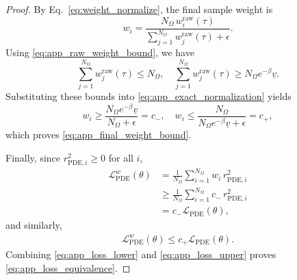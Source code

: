 \documentclass[10pt,a4paper]{amsart}
\begin{document}
\begin{proof}
	By Eq.~\eqref{eq:weight_normalize}, the final sample weight is
	\begin{equation}
		w_i
		=
		\frac{N_{\Omega}\,w_i^{\mathrm{raw}}(\tau)}
		{\sum_{j=1}^{N_{\Omega}}w_j^{\mathrm{raw}}(\tau)+\epsilon}.
		\label{eq:app_exact_normalization}
	\end{equation}
	Using \eqref{eq:app_raw_weight_bound}, we have
	\[
	\sum_{j=1}^{N_{\Omega}}w_j^{\mathrm{raw}}(\tau)
	\leqslant
	N_{\Omega},
	\quad
	\sum_{j=1}^{N_{\Omega}}w_j^{\mathrm{raw}}(\tau)
	\geqslant
	N_{\Omega}e^{-\beta}\underline{v}.
	\]
	Substituting these bounds into \eqref{eq:app_exact_normalization} yields
	\[
	w_i
	\geqslant
	\frac{N_{\Omega}e^{-\beta}\underline{v}}{N_{\Omega}+\epsilon}
	=
	c_-,
	\quad
	w_i
	\leqslant
	\frac{N_{\Omega}}{N_{\Omega}e^{-\beta}\underline{v}+\epsilon}
	=
	c_+,
	\]
	which proves \eqref{eq:app_final_weight_bound}.
	
	Finally, since
	$r_{\mathrm{PDE},i}^{2}\geqslant 0$ for all $i$,
	\begin{align}
		\mathcal{L}_{\mathrm{PDE}}^{w}(\theta)
		&=
		\frac{1}{N_{\Omega}}
		\sum_{i=1}^{N_{\Omega}}
		w_i\,r_{\mathrm{PDE},i}^{2}
		\nonumber\\
		&\geqslant
		\frac{1}{N_{\Omega}}
		\sum_{i=1}^{N_{\Omega}}
		c_-\,r_{\mathrm{PDE},i}^{2}
		\nonumber\\
		&=
		c_-\mathcal{L}_{\mathrm{PDE}}(\theta),
		\label{eq:app_loss_lower}
	\end{align}
	and similarly,
	\begin{align}
		\mathcal{L}_{\mathrm{PDE}}^{w}(\theta)
		\leqslant
		c_+\mathcal{L}_{\mathrm{PDE}}(\theta).
		\label{eq:app_loss_upper}
	\end{align}
	Combining \eqref{eq:app_loss_lower} and \eqref{eq:app_loss_upper}
	proves \eqref{eq:app_loss_equivalence}.
\end{proof}
\end{document}

